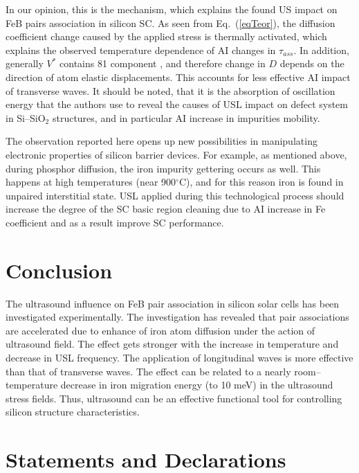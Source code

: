 \documentclass[sn-mathphys]{sn-jnl}%
\theoremstyle{thmstyleone}%
\theoremstyle{thmstyletwo}%
\theoremstyle{thmstylethree}%
\begin{document}
In our opinion, this is the mechanism, which explains the found US impact on FeB pairs association in silicon SC.
As seen from Eq.~(\ref{eqTeor}), the diffusion coefficient change caused
by the applied stress is thermally  activated, which explains the observed
temperature dependence of AI changes in $\tau_{ass}$.
In addition, generally $V^*$ contains 81 component  \cite{AZIZ2001},
and therefore change in $D$ depends on the direction of atom elastic displacements.
This accounts for less effective AI impact of transverse waves.
It should be noted, that it is the absorption of oscillation energy that the authors \cite{GORB2020,UST:Medvid}
use to reveal the causes of USL impact on defect system in Si--SiO$_2$ structures,
and in particular AI increase in impurities mobility.

The observation reported here opens up new possibilities in manipulating electronic
properties of silicon barrier devices.
For example, as mentioned above, during phosphor diffusion, the iron impurity gettering occurs as well.
This happens at high temperatures (near 900$^\circ$C),
and for this reason iron is found in unpaired interstitial state.
USL applied during this technological process should increase the degree of the SC basic region
cleaning due to AI increase in Fe coefficient and as a result improve SC performance.

\section{Conclusion}

The ultrasound influence on
FeB pair association in silicon solar cells has been investigated experimentally.
The investigation has revealed that pair associations are accelerated due to enhance of iron
atom diffusion under the action of ultrasound field.
The effect gets stronger with the increase in temperature and decrease in USL frequency.
The application of longitudinal waves is more effective than that of transverse waves.
The effect can be related to a nearly room--temperature decrease in iron migration energy (to 10 meV) in the ultrasound stress ﬁelds.
Thus, ultrasound can be an effective functional tool for controlling silicon structure characteristics.


\backmatter


%

\section*{Statements and Declarations}
\end{document}

